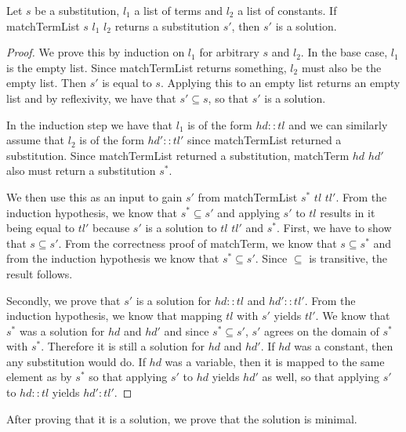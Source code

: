 \begin{lemma}[\matchTermListFindsSolution]
    Let $s$ be a substitution, $l_1$ a list of terms and $l_2$ a list of constants. If matchTermList $s$ $l_1$ $l_2$ returns a substitution $s'$, then $s'$ is a solution.
\end{lemma}
\begin{proof}
    We prove this by induction on $l_1$ for arbitrary $s$ and $l_2$.
    In the base case, $l_1$ is the empty list. Since matchTermList returns something, $l_2$ must also be the empty list. Then $s'$ is equal to $s$. Applying this to an empty list returns an empty list and by reflexivity, we have that $s' \subseteq s$, so that $s'$ is a solution.

    In the induction step we have that $l_1$ is of the form $hd::tl$ and we can similarly assume that $l_2$ is of the form $hd'::tl'$ since matchTermList returned a substitution. Since matchTermList returned a substitution, matchTerm $hd$ $hd'$ also must return a substitution $s^\ast$.

    We then use this as an input to gain $s'$ from matchTermList $s^\ast$ $tl$ $tl'$. From the induction hypothesis, we know that $s^\ast \subseteq s'$ and applying $s'$ to $tl$ results in it being equal to $tl'$ because $s'$ is a solution to $tl$ $tl'$ and $s^\ast$. 
    First, we have to show that $s \subseteq s'$. From the correctness proof of matchTerm, we know that $s \subseteq s^\ast$ and from the induction hypothesis we know that $s^\ast \subseteq s'$. Since $\subseteq$ is transitive, the result follows.

    Secondly, we prove that $s'$ is a solution for $hd::tl$ and $hd'::tl'$. From the induction hypothesis, we know that mapping $tl$ with $s'$ yields $tl'$. We know that $s^\ast$ was a solution for $hd$ and $hd'$ and since $s^\ast \subseteq s'$, $s'$ agrees on the domain of $s^\ast$ with $s^\ast$. Therefore it is still a solution for $hd$ and $hd'$. If $hd$ was a constant, then any substitution would do. If $hd$ was a variable, then it is mapped to the same element as by $s^\ast$ so that applying $s'$ to $hd$ yields $hd'$ as well, so that applying $s'$ to $hd::tl$ yields $hd':tl'$. 
\end{proof}

After proving that it is a solution, we prove that the solution is minimal.

